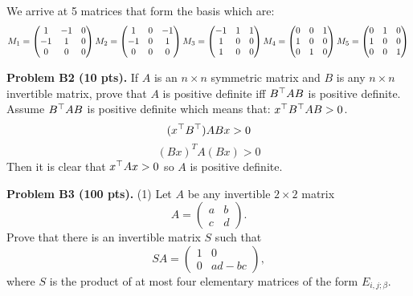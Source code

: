 \documentclass[12pt]{article}
\begin{document}
We arrive at 5 matrices that form the basis which are:
$$M_1 = \begin{pmatrix} 1 & -1 & 0 \\ -1 & 1 & 0\\ 0 & 0 & 0 \end{pmatrix} \\
M_2 = \begin{pmatrix} 1 & 0 & -1 \\ -1 & 0 & 1\\ 0 & 0 & 0 \end{pmatrix} \\
M_3 = \begin{pmatrix} -1 & 1 & 1 \\ 1 & 0 & 0\\ 1 & 0 & 0 \end{pmatrix}\\
M_4 = \begin{pmatrix} 0 & 0 & 1 \\ 1 & 0 & 0\\ 0 & 1 & 0 \end{pmatrix}\\
M_5 = \begin{pmatrix} 0 & 1 & 0 \\ 1 & 0 & 0\\ 0 & 0 & 1 \end{pmatrix}\\
$$


\vspace {0.25cm}\noindent
{\bf Problem B2 (10 pts).}
If $A$ is an $n\times n$ symmetric matrix and $B$ is any 
$n\times n$ invertible matrix, prove that $A$ is positive definite
iff $B^{\top} A B$ is positive definite.
\\

Assume $B^{\top} A B$ is positive definite which means that: $x^{\top}B^{\top}AB>0$.
\begin{equation*}
(x^{\top}B^{\top})ABx>0
\end{equation*}
\begin{equation*}
(Bx)^TA(Bx)>0
\end{equation*}
Then it is clear that $x^{\top}Ax >0$ so  
$A$ is positive definite.


\vspace {0.25cm}\noindent
{\bf Problem B3 (100 pts).}
(1)
Let $A$ be any invertible $2\times 2$ matrix
\[
A = 
\begin{pmatrix}
a & b \\
c & d
\end{pmatrix}.
\]
Prove that there is an invertible matrix $S$ such that
\[
SA = 
\begin{pmatrix}
1 & 0 \\
0 & ad - bc
\end{pmatrix},
\]
where $S$ is the product of at most four elementary matrices
of the form $E_{i, j; \beta}$.
\end{document}
